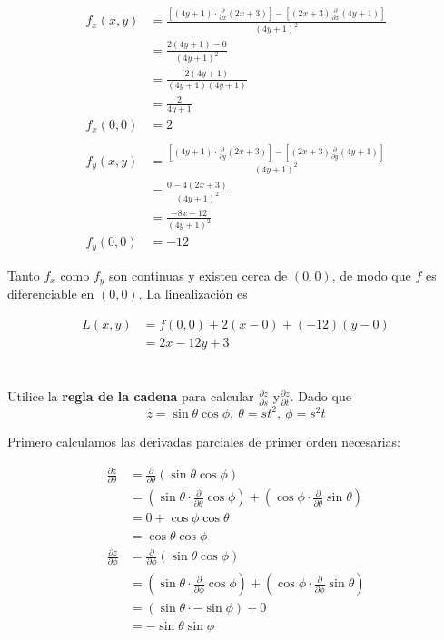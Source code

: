 \documentclass[12pt]{article}
\begin{document}
\begin{align*}
  f_x(x,y)
  &= \frac{\left[(4y +1)\cdot \frac{\partial}{\partial x} (2x+3)\right] - \left[(2x+3)\frac{\partial}{\partial x}(4y+1)\right]}{(4y +1)^2} \\
  &= \frac{2(4y+1)-0}{(4y +1)^2} \\
  &= \frac{2(4y+1)}{(4y +1)(4y+1)} \\
  &= \frac{2}{4y +1} \\
  f_x(0,0) &= 2 \\ \\
  f_y(x,y)
  &= \frac{\left[(4y +1)\cdot \frac{\partial}{\partial y} (2x+3)\right] - \left[(2x+3)\frac{\partial}{\partial y}(4y+1)\right]}{(4y +1)^2} \\
  &= \frac{0-4(2x+3)}{(4y +1)^2} \\
  &= \frac{-8x-12}{(4y +1)^2} \\
  f_y(0,0)&=-12
\end{align*}

Tanto $f_x$ como $f_y$ son continuas y existen cerca de $(0,0)$, de modo que $f$ es diferenciable en $(0,0)$. La linealización es

\begin{align*}
  L(x,y)
  &= f(0,0) + 2(x-0) + (-12)(y-0) \\
  &= 2x -12y + 3
\end{align*}

\section{}

Utilice la \textbf{regla de la cadena} para calcular $\frac{\partial z}{\partial s}$ y$\frac{\partial z}{\partial t}$. Dado que
$$z = \sin{\theta}\cos{\phi}, ~ \theta = st^2, ~ \phi = s^2t$$ 

Primero calculamos las derivadas parciales de primer orden necesarias:

\begin{align*}
  \frac{\partial z}{\partial \theta}
  &= \frac{\partial}{\partial \theta} (\sin{\theta}\cos{\phi}) \\
  &= \left(\sin{\theta}\cdot\frac{\partial}{\partial \theta}\cos{\phi}\right) + \left(\cos{\phi}\cdot\frac{\partial}{\partial \theta}\sin{\theta}\right)\\
  &= 0 + \cos{\phi}\cos{\theta} \\
  &= \cos{\theta}\cos{\phi} \\
  \frac{\partial z}{\partial \phi}
  &= \frac{\partial}{\partial \phi}( \sin{\theta}\cos{\phi}) \\
  &= \left(\sin{\theta}\cdot\frac{\partial}{\partial \phi}\cos{\phi}\right) + \left(\cos{\phi}\cdot\frac{\partial}{\partial \phi}\sin{\theta}\right)\\
  &= (\sin{\theta} \cdot -\sin{\phi}) + 0 \\
  &= -\sin{\theta}\sin{\phi}
\end{align*}
\end{document}
